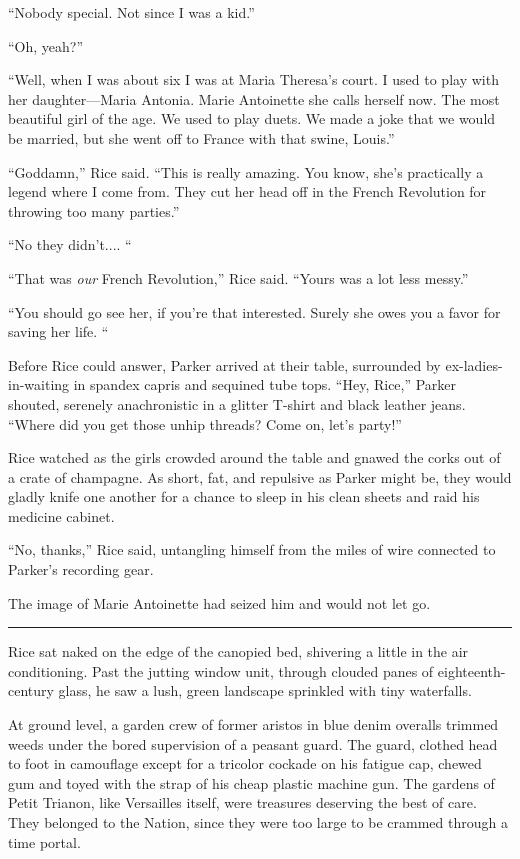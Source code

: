 ``Nobody special. Not since I was a kid.''

``Oh, yeah?''

``Well, when I was about six I was at Maria Theresa's court. I used to play with her daughter—Maria Antonia. Marie Antoinette she calls herself now. The most beautiful girl of the age. We used to play duets. We made a joke that we would be married, but she went off to France with that swine, Louis.''

``Goddamn,'' Rice said. ``This is really amazing. You know, she's practically a legend where I come from. They cut her head off in the French Revolution for throwing too many parties.''

``No they didn't.... ``

``That was \textit{our} French Revolution,'' Rice said. ``Yours was a lot less messy.''

``You should go see her, if you're that interested. Surely she owes you a favor for saving her life. ``

Before Rice could answer, Parker arrived at their table, surrounded by ex-ladies-in-waiting in spandex capris and sequined tube tops. ``Hey, Rice,'' Parker shouted, serenely anachronistic in a glitter T-shirt and black leather jeans. ``Where did you get those unhip threads? Come on, let's party!''

Rice watched as the girls crowded around the table and gnawed the corks out of a crate of champagne. As short, fat, and repulsive as Parker might be, they would gladly knife one another for a chance to sleep in his clean sheets and raid his medicine cabinet.

``No, thanks,'' Rice said, untangling himself from the miles of wire connected to Parker's recording gear.

The image of Marie Antoinette had seized him and would not let go.

\fancybreak{* * *}

Rice sat naked on the edge of the canopied bed, shivering a little in the air conditioning. Past the jutting window unit, through clouded panes of eighteenth-century glass, he saw a lush, green landscape sprinkled with tiny waterfalls.

At ground level, a garden crew of former aristos in blue denim overalls trimmed weeds under the bored supervision of a peasant guard. The guard, clothed head to foot in camouflage except for a tricolor cockade on his fatigue cap, chewed gum and toyed with the strap of his cheap plastic machine gun. The gardens of Petit Trianon, like Versailles itself, were treasures deserving the best of care. They belonged to the Nation, since they were too large to be crammed through a time portal.

